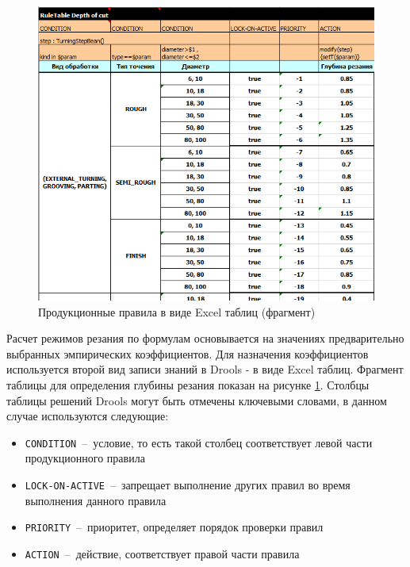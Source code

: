 \documentclass[14pt,oneside,final]{extreport}
\begin{document}
		\begin{figure}[!h]
			\begin{center}
				\includegraphics[width=\textwidth]{img/rules-table-excel} 
			\end{center}
			\caption{Продукционные правила в виде Excel таблиц (фрагмент)}
			\label{fig:rules-table-excel}
		\end{figure}  
	
	Расчет режимов резания по формулам основывается на значениях предварительно выбранных эмпирических коэффициентов. Для назначения коэффициентов используется второй вид записи знаний в Drools - в виде Excel таблиц. Фрагмент таблицы для определения глубины резания показан на рисунке \ref{fig:rules-table-excel}. Столбцы таблицы решений Drools могут быть отмечены ключевыми словами, в данном случае используются следующие: 
	\begin{itemize}
		\setlength\itemsep{0em}
		\item[]	\texttt{CONDITION}~--~условие, то есть такой столбец соответствует левой части продукционного правила
		\item[]	\texttt{LOCK-ON-ACTIVE}~--~запрещает выполнение других правил во время выполнения данного правила
		\item[]	\texttt{PRIORITY}~--~приоритет, определяет порядок проверки правил
		\item[]	\texttt{ACTION}~--~действие, соответствует правой части правила
	\end{itemize}
\end{document}
